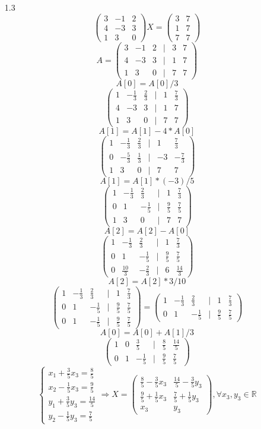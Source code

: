 \documentclass[a4paper]{article}
\newcommand{\mat}[1]{\begin{pmatrix} #1 \end{pmatrix}}
\renewcommand{\f}[2]{\frac{#1}{#2}}
\newcommand{\case}[1]{\begin{cases} #1 \end{cases}}
\renewcommand{\r}{\Rightarrow}
\newcommand{\RR}{\mathbb{R}}
\begin{document}
\begin{enumerate}
\begin{enumerate}
        \item[1.3]
        $$\mat{3 & -1 & 2 \\ 4 & -3 & 3 \\ 1 & 3 & 0}X = \mat{3 & 7 \\ 1 & 7 \\ 7 & 7}$$
        $$A = \mat{3 & -1 & 2 & | & 3 & 7\\ 4 & -3 & 3 & | & 1 & 7 \\ 1 & 3 & 0 & | & 7 & 7}$$
        $$A[0] = A[0]/3$$
        $$\mat{1 & -\f{1}{3} & \f{2}{3} & | & 1 & \f{7}{3} \\ 4 & -3 & 3 & | & 1 & 7 \\ 1 & 3 & 0 & | & 7 & 7}$$
        $$A[1] = A[1]-4*A[0]$$
        $$\mat{1 & -\f{1}{3} & \f{2}{3} & | & 1 & \f{7}{3} \\ 0 & -\f{5}{3} & \f{1}{3} & | & -3 & -\f{7}{3} \\ 1 & 3 & 0 & | & 7 & 7}$$
        $$A[1] = A[1]*(-3)/5$$
        $$\mat{1 & -\f{1}{3} & \f{2}{3} & | & 1 & \f{7}{3} \\ 0 & 1 & -\f{1}{5} & | & \f{9}{5} & \f{7}{5} \\ 1 & 3 & 0 & | & 7 & 7}$$
        $$A[2] = A[2]-A[0]$$
        $$\mat{1 & -\f{1}{3} & \f{2}{3} & | & 1 & \f{7}{3} \\ 0 & 1 & -\f{1}{5} & | & \f{9}{5} & \f{7}{5} \\ 0 & \f{10}{3} & -\f{2}{3} & | & 6 & \f{14}{3}}$$
        $$A[2] = A[2]*3/10$$
        $$\mat{1 & -\f{1}{3} & \f{2}{3} & | & 1 & \f{7}{3} \\ 0 & 1 & -\f{1}{5} & | & \f{9}{5} & \f{7}{5} \\ 0 & 1 & -\f{1}{5} & | & \f{9}{5} & \f{7}{5}} = \mat{1 & -\f{1}{3} & \f{2}{3} & | & 1 & \f{7}{3} \\ 0 & 1 & -\f{1}{5} & | & \f{9}{5} & \f{7}{5}}$$
        $$A[0] = A[0]+A[1]/3$$
        $$\mat{1 & 0 & \f{3}{5} & | & \f{8}{5} & \f{14}{5} \\ 0 & 1 & -\f{1}{5} & | & \f{9}{5} & \f{7}{5}}$$
        $$\case{
            x_1 +\f{3}{5}x_3 = \f{8}{5}\\
            x_2 -\f{1}{5}x_3 = \f{9}{5}\\
            y_1 +\f{3}{5}y_3 = \f{14}{5}\\
            y_2 -\f{1}{5}y_3 = \f{7}{5}
        } \r X = \mat{\f{8}{5}-\f{3}{5}x_3 & \f{14}{5}-\f{3}{5}y_3 \\ \f{9}{5}+\f{1}{5}x_3 & \f{7}{5}+\f{1}{5}y_3 \\ x_3 & y_3} , \forall x_3, y_3 \in \RR$$
        

\end{enumerate}
\end{enumerate}
\end{document}
